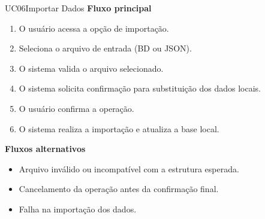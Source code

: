 \vspace{8pt}

\begin{usecase}{UC06}{Importar Dados}
    \uclinha
    \uclinha
    \uclinha
    \textbf{Fluxo principal}
    \vspace{4pt}
    \begin{enumerate}
        \item O usuário acessa a opção de importação.
        \item Seleciona o arquivo de entrada (BD ou JSON).
        \item O sistema valida o arquivo selecionado.
        \item O sistema solicita confirmação para substituição dos dados locais.
        \item O usuário confirma a operação.
        \item O sistema realiza a importação e atualiza a base local.
    \end{enumerate}
    \uclinha
    \textbf{Fluxos alternativos}
    \vspace{4pt}
    \begin{itemize}
        \item Arquivo inválido ou incompatível com a estrutura esperada.
        \item Cancelamento da operação antes da confirmação final.
        \item Falha na importação dos dados.
    \end{itemize}
    \uclinha
\end{usecase}

